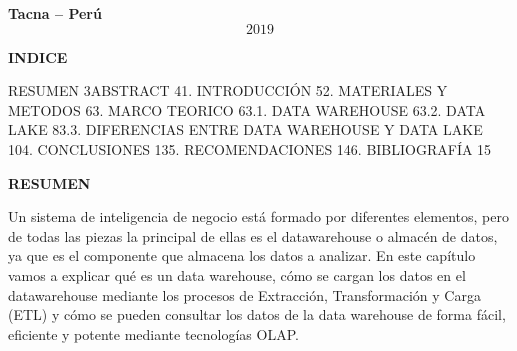 \documentclass{article} %
\begin{document}
\noindent \textbf{Tacna -- Per\'{u}}
\[2019\] 
\textbf{\underbar{}}

\noindent \textbf{\underbar{}}

\noindent \textbf{}

\noindent \textbf{}

\noindent \textbf{INDICE}

\noindent 

\noindent RESUMEN 3ABSTRACT 41. INTRODUCCI\'{O}N 52. MATERIALES Y METODOS 63. MARCO TEORICO 63.1. DATA WAREHOUSE 63.2. DATA LAKE 83.3. DIFERENCIAS ENTRE DATA WAREHOUSE Y DATA LAKE 104. CONCLUSIONES 135. RECOMENDACIONES 146. BIBLIOGRAF\'{I}A 15

\noindent \textbf{\underbar{}}

\noindent \textbf{\underbar{}}

\noindent \textbf{\underbar{}}

\noindent \textbf{\underbar{}}

\noindent \textbf{\underbar{}}

\noindent \textbf{\underbar{}}

\noindent \textbf{\underbar{}}

\noindent \textbf{\underbar{}}

\noindent \textbf{\underbar{}}

\noindent \textbf{\underbar{}}

\noindent \textbf{\underbar{}}

\noindent \textbf{\underbar{}}

\noindent \textbf{}

\noindent \textbf{}

\noindent \textbf{}

\noindent \textbf{\textit{\underbar{}}}

\noindent \textbf{}

\noindent \textbf{RESUMEN}

\noindent 

\noindent Un sistema de inteligencia de negocio est\'{a} formado por diferentes elementos, pero de todas las piezas la principal de ellas es el datawarehouse o almac\'{e}n de datos, ya que es el componente que almacena los datos a analizar. En este cap\'{i}tulo vamos a explicar qu\'{e} es un data warehouse, c\'{o}mo se cargan los datos en el datawarehouse mediante los procesos de Extracci\'{o}n, Transformaci\'{o}n y Carga (ETL) y c\'{o}mo se pueden consultar los datos de la data warehouse de forma f\'{a}cil, eficiente y potente mediante tecnolog\'{i}as OLAP.
\end{document}
